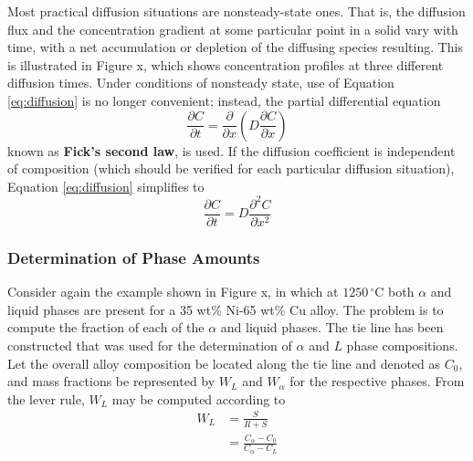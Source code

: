 Most practical diffusion situations are nonsteady-state ones. That is, the diffusion ﬂux and the concentration gradient at some particular point in a solid vary with time, with a net accumulation or depletion of the diffusing species resulting. This is illustrated in Figure x, which shows concentration proﬁles at three different diffusion times. Under conditions of nonsteady state, use of Equation \ref{eq:diffusion} is no longer convenient; instead, the partial differential equation
\begin{equation}
    \frac{\partial C}{\partial t} = \frac{\partial}{\partial x} (D \frac{\partial C}{\partial x})
    \label{eq:diffusion}
\end{equation}
known as \textbf{Fick's second law}, is used. If the diffusion coefficient is independent of composition (which should be verified for each particular diffusion situation), Equation \ref{eq:diffusion} simplifies to
\begin{equation}
    \frac{\partial C}{\partial t} = D \frac{\partial^2 C}{\partial x^2}
    \label{eq:diffusion2}
\end{equation}

\subsubsection{Determination of Phase Amounts}

Consider again the example shown in Figure x, in which at $\mathrm{1250 \,^\circ C}$ both $\alpha$ and liquid phases are present for a 35 wt\% Ni-65 wt\% Cu alloy. The problem is to compute the fraction of each of the $\alpha$ and liquid phases. The tie line has been constructed that was used for the determination of $\alpha$ and $L$ phase compositions. Let the overall alloy composition be located along the tie line and denoted as $C_0$, and mass fractions be represented by $W_L$ and $W_\alpha$ for the respective phases. From the lever rule, $W_L$ may be computed according to
\begin{align}
    W_L &= \frac{S}{R+S} \label{eq:lever1} \\
    &= \frac{C_\alpha-C_0}{C_\alpha-C_L} \label{eq:lever2}
\end{align}